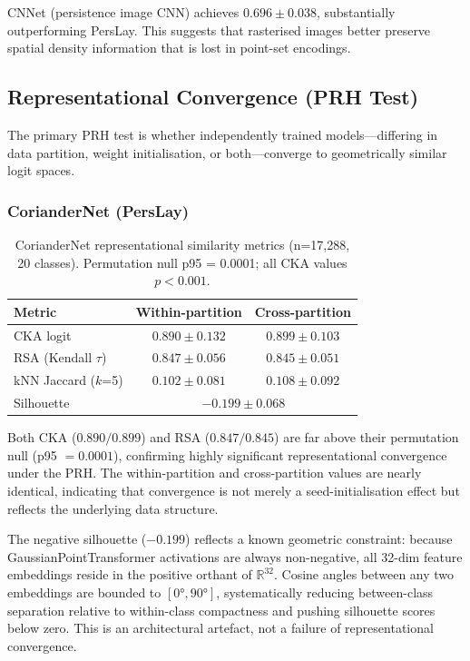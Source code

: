 CNNet (persistence image CNN) achieves $0.696 \pm 0.038$, substantially
outperforming PersLay.  This suggests that rasterised images better preserve
spatial density information that is lost in point-set encodings.

\subsection{Representational Convergence (PRH Test)}

The primary PRH test is whether independently trained models---differing in
data partition, weight initialisation, or both---converge to geometrically
similar logit spaces.

\subsubsection{CorianderNet (PersLay)}

\begin{table}[h]
\centering
\begin{tabular}{lcc}
\hline
Metric & Within-partition & Cross-partition \\
\hline
CKA logit         & $0.890 \pm 0.132$ & $0.899 \pm 0.103$ \\
RSA (Kendall $\tau$) & $0.847 \pm 0.056$ & $0.845 \pm 0.051$ \\
kNN Jaccard ($k$=5) & $0.102 \pm 0.081$ & $0.108 \pm 0.092$ \\
Silhouette        & \multicolumn{2}{c}{$-0.199 \pm 0.068$} \\
\hline
\end{tabular}
\caption{CorianderNet representational similarity metrics (n=17,288, 20 classes).
Permutation null p95 = 0.0001; all CKA values $p < 0.001$.}
\end{table}

Both CKA ($0.890/0.899$) and RSA ($0.847/0.845$) are far above their permutation
null (p95 $= 0.0001$), confirming highly significant representational convergence
under the PRH.  The within-partition and cross-partition values are nearly
identical, indicating that convergence is not merely a seed-initialisation effect
but reflects the underlying data structure.

The negative silhouette ($-0.199$) reflects a known geometric constraint: because
GaussianPointTransformer activations are always non-negative, all 32-dim feature
embeddings reside in the positive orthant of $\mathbb{R}^{32}$.  Cosine angles
between any two embeddings are bounded to $[0°, 90°]$, systematically reducing
between-class separation relative to within-class compactness and pushing
silhouette scores below zero.  This is an architectural artefact, not a failure
of representational convergence.

